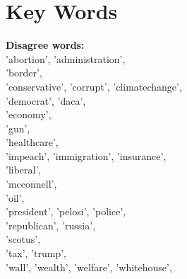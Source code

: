 \documentclass[../embeddings.tex]{subfiles}
\begin{document}
\section{Key Words}
\textbf{Disagree words:}\\
    'abortion', 'administration',\\
    'border',\\
    'conservative', 'corrupt', 'climatechange',\\
    'democrat', 'daca',\\
    'economy',\\
    'gun',\\
    'healthcare',\\    
    'impeach', 'immigration', 'insurance',\\
    'liberal',\\   
    'mcconnell',\\
    'oil',\\
    'president', 'pelosi', 'police',\\
    'republican', 'russia',\\
    'scotus',\\
    'tax', 'trump',\\
    'wall', 'wealth', 'welfare', 'whitehouse',\\
\end{document}

